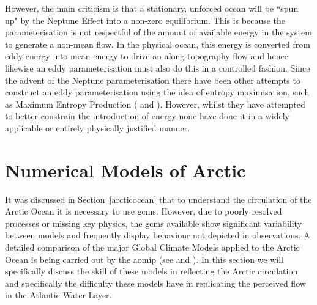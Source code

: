 \documentclass[12pt,a4paper]{report}
\newcommand*\secref[1]{Section~\ref{#1}}
\begin{document}
                	 However, the main criticism is that a stationary, unforced ocean will
                	  be ``spun up" by the Neptune Effect into a non-zero equilibrium. 
                	  This is because the parameterisation is not respectful
                	 of the amount of available energy in the system to generate a non-mean
                	 flow. In the physical ocean, this energy is converted from eddy
                	 energy into mean energy to drive an along-topography flow and
                	 hence likewise an eddy parameterisation must also do this in a controlled fashion. Since the advent of the Neptune parameterisation there
                	 have been other attempts to construct an eddy parameterisation
                	 using the idea of entropy  maximisation, such as 
                	 Maximum Entropy Production (\cite{kazantsev1998subgrid} and \cite{polyakov2001eddy}). However,
                	 whilst they have attempted to better constrain the introduction of energy none have done it in a widely applicable or entirely 
                	 physically justified manner.
                	
\section{Numerical Models of Arctic}
\label{arcticnumerics}

	It was discussed in \secref{arcticocean} that to understand the circulation of the Arctic
	 Ocean it is necessary to use \glspl{gcm}. However, due to poorly resolved processes or
	  missing key physics, the \glspl{gcm} available show significant variability between
	   models and frequently display behaviour not depicted in observations. 
	A detailed comparison of the major Global Climate Models applied to the Arctic Ocean is
	 being carried out by the \gls{aomip} (see \cite{proshutinsky2008toward} and
	  \cite{proshutinsky2011recent}). In this section we will specifically discuss the skill
	   of these models in reflecting the Arctic circulation and specifically the difficulty
	    these models have in replicating the perceived flow in the Atlantic Water Layer.  
\end{document}
